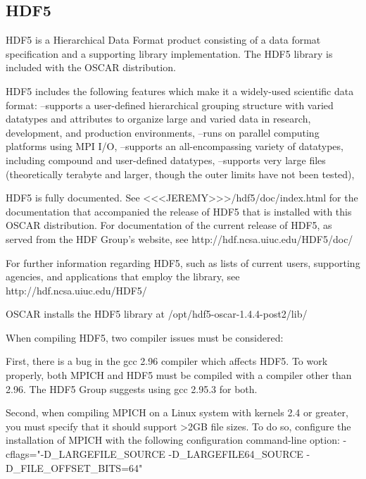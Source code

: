%
%
%

\subsection{HDF5}
\label{app:hdf5-overview}

HDF5 is a Hierarchical Data Format product consisting of a data format 
specification and a supporting library implementation. The HDF5 library
is included with the OSCAR distribution.


HDF5 includes the following features which make it a widely-used 
scientific data format:
   --supports a user-defined hierarchical grouping structure with 
     varied datatypes and attributes to organize large and varied data 
         in research, development, and production environments,
   --runs on parallel computing platforms using MPI I/O,
   --supports an all-encompassing variety of datatypes, including 
         compound and user-defined datatypes,
   --supports very large files (theoretically terabyte and larger, 
         though the outer limits have not been tested), 


HDF5 is fully documented.  See
   <<<JEREMY>>>/hdf5/doc/index.html
   for the documentation that accompanied the release of HDF5 that is
   installed with this OSCAR distribution. 
For documentation of the current release of HDF5, as served from the 
   HDF Group's website, see
   http://hdf.ncsa.uiuc.edu/HDF5/doc/


For further information regarding HDF5, such as lists of current users,
supporting agencies, and applications that employ the library, see
    http://hdf.ncsa.uiuc.edu/HDF5/


OSCAR installs the HDF5 library at /opt/hdf5-oscar-1.4.4-post2/lib/

When compiling HDF5, two compiler issues must be considered:

First, there is a bug in the gcc 2.96 compiler which affects HDF5. 
To work properly, both MPICH and HDF5 must be compiled with a compiler 
other than 2.96. The HDF5 Group suggests using gcc 2.95.3 for both.

Second, when compiling MPICH on a Linux system with kernels 2.4 or
greater, you must specify that it should support >2GB file sizes. To
do so, configure the installation of MPICH with the following
configuration command-line option:
-cflags="-D_LARGEFILE_SOURCE -D_LARGEFILE64_SOURCE -D_FILE_OFFSET_BITS=64"

